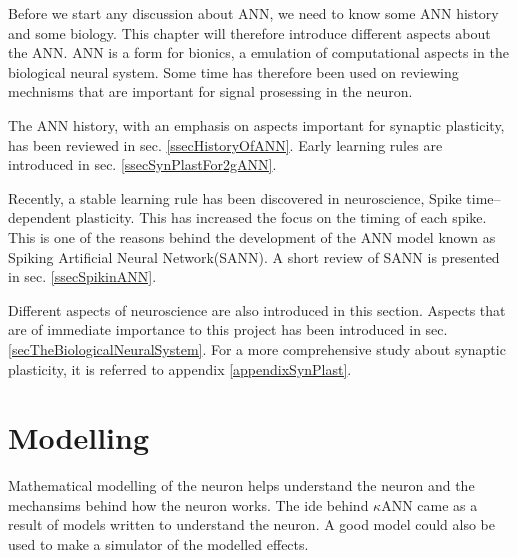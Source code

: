 \documentclass[b5paper,11 pt]{report}
\begin{document}
	Before we start any discussion about ANN, we need to know some ANN history and some biology.
	This chapter will therefore introduce different aspects about the ANN.
	ANN is a form for bionics, a emulation of computational aspects in the biological neural system.
	Some time has therefore been used on reviewing mechnisms that are important for signal prosessing in the neuron.

	The ANN history, with an emphasis on aspects important for synaptic plasticity, has been reviewed in sec. \ref{ssecHistoryOfANN}.
	Early learning rules are introduced in sec. \ref{ssecSynPlastFor2gANN}. 

	Recently, a stable learning rule has been discovered in neuroscience, Spike time--dependent plasticity.
	This has increased the focus on the timing of each spike.
	This is one of the reasons behind the development of the ANN model known as Spiking Artificial Neural Network(SANN).
	A short review of SANN is presented in sec. \ref{ssecSpikinANN}.
	
	Different aspects of neuroscience are also introduced in this section.
	Aspects that are of immediate importance to this project has been introduced in sec. \ref{secTheBiologicalNeuralSystem}.
	For a more comprehensive study about synaptic plasticity, it is referred to appendix \ref{appendixSynPlast}.


	

	


\chapter{Modelling} 				%

	Mathematical modelling of the neuron helps understand the neuron and the mechansims behind how the neuron works.
	The ide behind $\kappa$ANN came as a result of models written to understand the neuron.
	A good model could also be used to make a simulator of the modelled effects. 
\end{document}
